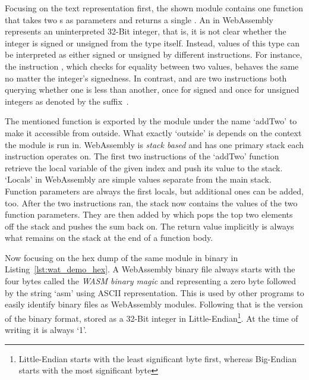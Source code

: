 Focusing on the text representation first, the shown module contains one function that takes two s as parameters and returns a single .
An  in WebAssembly represents an uninterpreted 32-Bit integer, that is, it is not clear whether the integer is signed or unsigned from the type itself.
Instead, values of this type can be interpreted as either signed or unsigned by different instructions.
For instance, the instruction , which checks for equality between two  values, behaves the same no matter the integer's signedness.
In contrast,  and  are two instructions both querying whether one  is less than another, once for signed and once for unsigned integers as denoted by the suffix~\cite[p.46]{Sendil2022-fy}.

The mentioned function is exported by the module under the name `addTwo' to make it accessible from outside.
What exactly `outside' is depends on the context the module is run in.
WebAssembly is \emph{stack based} and has one primary stack each instruction operates on.
The first two instructions of the `addTwo' function retrieve the local variable of the given index and push its value to the stack.
`Locals' in WebAssembly are simple values separate from the main stack.
Function parameters are always the first locals, but additional ones can be added, too.
After the two instructions ran, the stack now contains the values of the two function parameters.
They are then added by  which pops the top two elements off the stack and pushes the sum back on.
The return value implicitly is always what remains on the stack at the end of a function body.

Now focusing on the hex dump of the same module in binary in Listing~\ref{lst:wat_demo_hex}.
A WebAssembly binary file always starts with the four bytes  called the \emph{WASM binary magic} and representing a zero byte followed by the string `asm' using ASCII representation.
This is used by other programs to easily identify binary files as WebAssembly modules.
Following that is the version of the binary format, stored as a 32-Bit integer in Little-Endian\footnote{Little-Endian starts with the least significant byte first, whereas Big-Endian starts with the most significant byte}.
At the time of writing it is always `1'.

